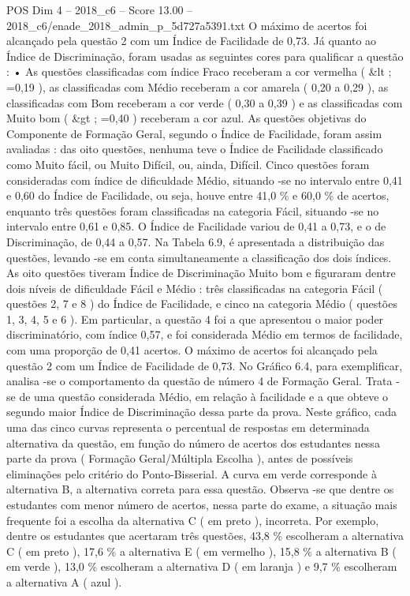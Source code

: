 \begin{textsample}{POS Dim 4 – 2018\_c6 – Score 13.00 – 2018\_c6/enade\_2018\_admin\_p\_5d727a5391.txt}
O máximo de acertos foi alcançado pela questão 2 com um Índice de Facilidade de 0,73.
Já quanto ao Índice de Discriminação, foram usadas as seguintes cores para qualificar a questão : • As questões classificadas com índice Fraco receberam a cor vermelha ( \&lt ; =0,19 ), as classificadas com Médio receberam a cor amarela ( 0,20 a 0,29 ), as classificadas com Bom receberam a cor verde ( 0,30 a 0,39 ) e as classificadas com Muito bom ( \&gt ; =0,40 ) receberam a cor azul.
As questões objetivas do Componente de Formação Geral, segundo o Índice de Facilidade, foram assim avaliadas : das oito questões, nenhuma teve o Índice de Facilidade classificado como Muito fácil, ou Muito Difícil, ou, ainda, Difícil.
Cinco questões foram consideradas com índice de dificuldade Médio, situando -se no intervalo entre 0,41 e 0,60 do Índice de Facilidade, ou seja, houve entre 41,0 \% e 60,0 \% de acertos, enquanto três questões foram classificadas na categoria Fácil, situando -se no intervalo entre 0,61 e 0,85.
O Índice de Facilidade variou de 0,41 a 0,73, e o de Discriminação, de 0,44 a 0,57.
Na Tabela 6.9, é apresentada a distribuição das questões, levando -se em conta simultaneamente a classificação dos dois índices.
As oito questões tiveram Índice de Discriminação Muito bom e figuraram dentre dois níveis de dificuldade Fácil e Médio : três classificadas na categoria Fácil ( questões 2, 7 e 8 ) do Índice de Facilidade, e cinco na categoria Médio ( questões 1, 3, 4, 5 e 6 ).
Em particular, a questão 4 foi a que apresentou o maior poder discriminatório, com índice 0,57, e foi considerada Médio em termos de facilidade, com uma proporção de 0,41 acertos.
O máximo de acertos foi alcançado pela questão 2 com um Índice de Facilidade de 0,73.
No Gráfico 6.4, para exemplificar, analisa -se o comportamento da questão de número 4 de Formação Geral.
Trata -se de uma questão considerada Médio, em relação à facilidade e a que obteve o segundo maior Índice de Discriminação dessa parte da prova.
Neste gráfico, cada uma das cinco curvas representa o percentual de respostas em determinada alternativa da questão, em função do número de acertos dos estudantes nessa parte da prova ( Formação Geral/Múltipla Escolha ), antes de possíveis eliminações pelo critério do Ponto-Bisserial.
A curva em verde corresponde à alternativa B, a alternativa correta para essa questão.
Observa -se que dentre os estudantes com menor número de acertos, nessa parte do exame, a situação mais frequente foi a escolha da alternativa C ( em preto ), incorreta.
Por exemplo, dentre os estudantes que acertaram três questões, 43,8 \% escolheram a alternativa C ( em preto ), 17,6 \% a alternativa E ( em vermelho ), 15,8 \% a alternativa B ( em verde ), 13,0 \% escolheram a alternativa D ( em laranja ) e 9,7 \% escolheram a alternativa A ( azul ).

\end{textsample}
